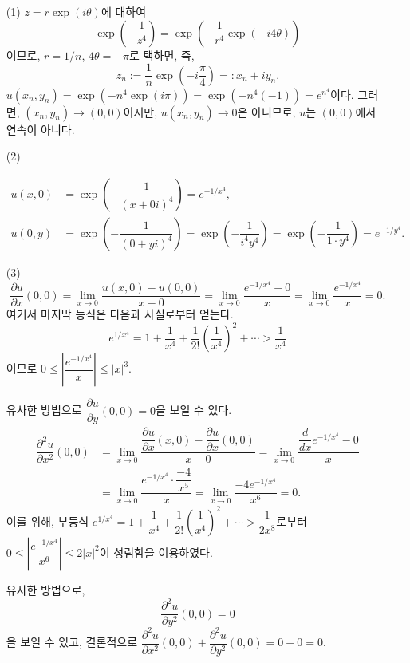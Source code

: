\begin{itemize}
\item[(1)] $z=r\exp(i\theta)$에 대하여
\[
\exp\left(-\dfrac1{z^4}\right) = \exp\left( -\dfrac1{r^4} \exp(-i4\theta)\right)
\]
이므로, $r= 1/n$, $4\theta = -\pi$로 택하면, 즉,
\[
z_n := \dfrac1n \exp\left( -i\dfrac\pi4 \right) =: x_n + iy_n.
\]
$u(x_n,y_n) = \exp(-n^4\exp(i\pi)) = \exp(-n^4(-1)) = e^{n^4}$이다.
그러면, $(x_n, y_n)\to (0,0)$이지만, $u(x_n, y_n) \to 0$은 아니므로,
$u$는 $(0,0)$에서 연속이 아니다.

\item[(2)] 

\begin{align*}
u(x,0) &= \exp\left( - \dfrac1{(x+0i)^4} \right) = e^{-1/x^4}, \\
u(0,y) &= \exp\left( - \dfrac1{(0+yi)^4} \right) = \exp\left( - \dfrac1{i^4y^4}\right)
= \exp\left( - \dfrac1{1\cdot y^4} \right) = e^{-1/y^4}.
\end{align*}

\item[(3)] 
\[
\dfrac{\partial u}{\partial x}(0,0) =
\lim_{x\to 0} \dfrac{u(x,0) - u(0,0)}{x-0} = \lim_{x\to 0} \dfrac{e^{-1/x^4}-0}x
= \lim_{x\to 0} \dfrac{e^{-1/x^4}}x = 0.
\]
여기서 마지막 등식은 다음과 사실로부터 얻는다.
\[
e^{1/x^4} = 1 + \dfrac1{x^4} + \dfrac1{2!}\left(\dfrac1{x^4}\right)^2 
+ \cdots > \dfrac1{x^4}
\]
이므로 $0\le \left| \dfrac{e^{-1/x^4}}x\right| \le |x|^3$.

유사한 방법으로 $\dfrac{\partial u}{\partial y}(0,0) =0$을 보일 수 있다.
\begin{align*}
\dfrac{\partial^2 u}{\partial x^2} (0,0)
&= \lim_{x\to0} \dfrac{ \dfrac{\partial u}{\partial x}(x,0) -\dfrac{\partial u}{\partial x}(0,0)}
{x-0} = \lim_{x\to0} \dfrac{\dfrac d{dx}e^{-1/x^4} - 0}x \\
&= \lim_{x\to0}  \dfrac{e^{-1/x^4}\cdot \dfrac{-4}{x^5}}x
= \lim_{x\to0} \dfrac{-4e^{-1/x^4}}{x^6} = 0.
\end{align*}
이를 위해, 부등식
$e^{1/x^4} = 1 + \dfrac1{x^4} + \dfrac1{2!}\left(\dfrac1{x^4}\right)^2 + \cdots
> \dfrac1{2x^8}$로부터 
$0\le \left| \dfrac{e^{-1/x^4}}{x^6}\right| \le 2|x|^2$이 성림함을 이용하였다.

유사한 방법으로,
\[
\dfrac{\partial^2u}{\partial y^2}(0,0)=0
\]
을 보일 수 있고, 결론적으로 
$\dfrac{\partial^2 u}{\partial x^2}(0,0) + \dfrac{\partial^2 u}{\partial y^2}(0,0) = 0+0=0$.
\end{itemize}

